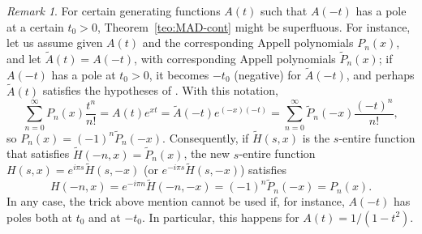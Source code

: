 \documentclass[11pt,a4paper]{amsart}
\theoremstyle{plain}
\theoremstyle{plain}
\theoremstyle{remark}
\newtheorem{remark}{Remark}
\numberwithin{equation}{section}
\begin{document}
\begin{remark}
For certain generating functions $A(t)$ such that $A(-t)$ has a pole at a certain $t_0>0$, Theorem~\ref{teo:MAD-cont} might be superfluous. For instance, let us assume given $A(t)$ and the corresponding Appell polynomials $P_n(x)$, and let $\widetilde{A}(t) = A(-t)$, with corresponding Appell polynomials $\widetilde{P}_n(x)$; if $A(-t)$ has a pole at $t_0>0$, it becomes $-t_0$ (negative) for $\widetilde{A}(-t)$, and perhaps $\widetilde{A}(t)$ satisfies the hypotheses of \cite[Theorem~1]{NRV}. 
With this notation, 
\[
\sum_{n=0}^\infty P_{n}(x)\frac{t^n}{n!} = A(t) e^{xt} 
= \widetilde{A}(-t) e^{(-x)(-t)} 
= \sum_{n=0}^\infty \widetilde{P}_{n}(-x) \frac{(-t)^n}{n!},
\]
so $P_{n}(x) = (-1)^n \widetilde{P}_{n}(-x)$. Consequently, if $\widetilde{H}(s,x)$ is the $s$-entire function that satisfies $\widetilde{H}(-n,x) = \widetilde{P}_n(x)$, the new $s$-entire function $H(s,x) = e^{i\pi s} \widetilde{H}(s,-x)$ (or $e^{-i\pi s} \widetilde{H}(s,-x)$) satisfies
\[
  H(-n,x) = e^{-i\pi n} \widetilde{H}(-n,-x) = (-1)^n \widetilde{P}_{n}(-x) = P_{n}(x).
\]
In any case, the trick above mention cannot be used if, for instance, $A(-t)$ has poles both at $t_0$ and at $-t_0$. In particular, this happens for $A(t) = 1/(1-t^2)$.
\end{remark}
\end{document}
